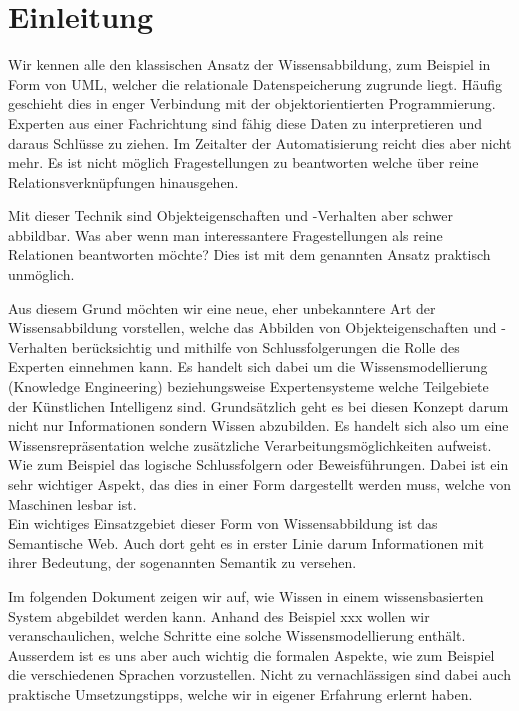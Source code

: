 \chapter{Einleitung}
\label{chap:einleitung}
Wir kennen alle den klassischen Ansatz der Wissensabbildung, zum Beispiel in Form von UML, welcher die relationale Datenspeicherung zugrunde liegt. Häufig geschieht dies in enger Verbindung mit der objektorientierten Programmierung. Experten aus einer Fachrichtung sind fähig diese Daten zu interpretieren und daraus Schlüsse zu ziehen. Im Zeitalter der Automatisierung reicht dies aber nicht mehr. Es ist nicht möglich Fragestellungen zu beantworten welche über reine Relationsverknüpfungen hinausgehen.


Mit dieser Technik sind Objekteigenschaften und -Verhalten aber schwer abbildbar. Was aber wenn man interessantere Fragestellungen als reine Relationen beantworten möchte? Dies ist mit dem genannten Ansatz praktisch unmöglich.  

Aus diesem Grund möchten wir eine neue, eher unbekanntere Art der Wissensabbildung vorstellen, welche das Abbilden von Objekteigenschaften und -Verhalten berücksichtig und mithilfe von Schlussfolgerungen die Rolle des Experten einnehmen kann. Es handelt sich dabei um die Wissensmodellierung (Knowledge Engineering) beziehungsweise Expertensysteme welche Teilgebiete der Künstlichen Intelligenz sind. Grundsätzlich geht es bei diesen Konzept darum nicht nur Informationen sondern Wissen abzubilden. Es handelt sich also um eine Wissensrepräsentation welche zusätzliche Verarbeitungsmöglichkeiten aufweist. Wie zum Beispiel  das logische Schlussfolgern oder Beweisführungen. Dabei ist ein sehr wichtiger Aspekt, das dies in einer Form dargestellt werden muss, welche von  Maschinen lesbar ist.\cite{ISpekOntoGeschichte}\\
Ein wichtiges Einsatzgebiet dieser Form von Wissensabbildung ist das Semantische Web. Auch dort geht es in erster Linie darum Informationen mit ihrer Bedeutung, der sogenannten Semantik zu versehen. 


Im folgenden Dokument zeigen wir auf, wie Wissen in einem wissensbasierten System abgebildet werden kann. Anhand des Beispiel xxx wollen wir veranschaulichen, welche Schritte eine solche Wissensmodellierung enthält. Ausserdem ist es uns aber auch wichtig die formalen Aspekte, wie zum Beispiel die verschiedenen Sprachen vorzustellen. Nicht zu vernachlässigen sind dabei auch praktische Umsetzungstipps, welche wir in eigener Erfahrung erlernt haben.

